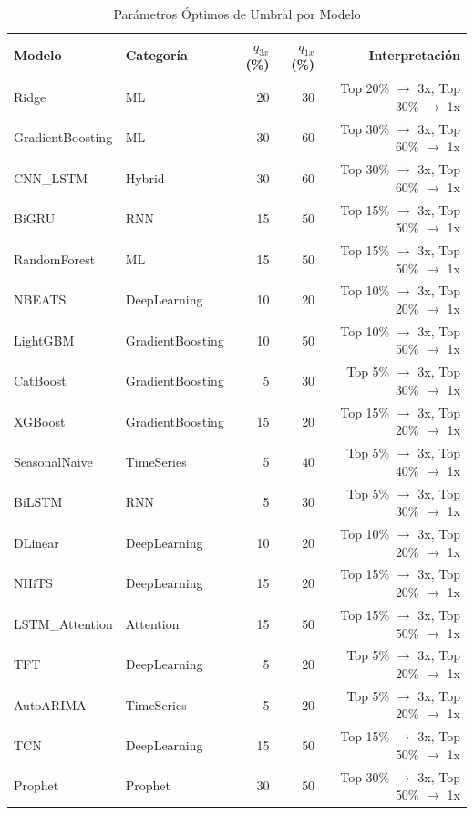\begin{table}[htbp]
\centering
\caption{Par\'ametros \'Optimos de Umbral por Modelo}
\label{tab:optimal_params}
\small
\begin{tabular}{@{}llrrr@{}}
\toprule
\textbf{Modelo} & \textbf{Categor\'ia} & \textbf{$q_{3x}$ (\%)} & \textbf{$q_{1x}$ (\%)} & \textbf{Interpretaci\'on} \\
\midrule
Ridge & ML & 20 & 30 & Top 20\% $\rightarrow$ 3x, Top 30\% $\rightarrow$ 1x \\
GradientBoosting & ML & 30 & 60 & Top 30\% $\rightarrow$ 3x, Top 60\% $\rightarrow$ 1x \\
CNN\_LSTM & Hybrid & 30 & 60 & Top 30\% $\rightarrow$ 3x, Top 60\% $\rightarrow$ 1x \\
BiGRU & RNN & 15 & 50 & Top 15\% $\rightarrow$ 3x, Top 50\% $\rightarrow$ 1x \\
RandomForest & ML & 15 & 50 & Top 15\% $\rightarrow$ 3x, Top 50\% $\rightarrow$ 1x \\
NBEATS & DeepLearning & 10 & 20 & Top 10\% $\rightarrow$ 3x, Top 20\% $\rightarrow$ 1x \\
LightGBM & GradientBoosting & 10 & 50 & Top 10\% $\rightarrow$ 3x, Top 50\% $\rightarrow$ 1x \\
CatBoost & GradientBoosting & 5 & 30 & Top 5\% $\rightarrow$ 3x, Top 30\% $\rightarrow$ 1x \\
XGBoost & GradientBoosting & 15 & 20 & Top 15\% $\rightarrow$ 3x, Top 20\% $\rightarrow$ 1x \\
SeasonalNaive & TimeSeries & 5 & 40 & Top 5\% $\rightarrow$ 3x, Top 40\% $\rightarrow$ 1x \\
BiLSTM & RNN & 5 & 30 & Top 5\% $\rightarrow$ 3x, Top 30\% $\rightarrow$ 1x \\
DLinear & DeepLearning & 10 & 20 & Top 10\% $\rightarrow$ 3x, Top 20\% $\rightarrow$ 1x \\
NHiTS & DeepLearning & 15 & 20 & Top 15\% $\rightarrow$ 3x, Top 20\% $\rightarrow$ 1x \\
LSTM\_Attention & Attention & 15 & 50 & Top 15\% $\rightarrow$ 3x, Top 50\% $\rightarrow$ 1x \\
TFT & DeepLearning & 5 & 20 & Top 5\% $\rightarrow$ 3x, Top 20\% $\rightarrow$ 1x \\
AutoARIMA & TimeSeries & 5 & 20 & Top 5\% $\rightarrow$ 3x, Top 20\% $\rightarrow$ 1x \\
TCN & DeepLearning & 15 & 50 & Top 15\% $\rightarrow$ 3x, Top 50\% $\rightarrow$ 1x \\
Prophet & Prophet & 30 & 50 & Top 30\% $\rightarrow$ 3x, Top 50\% $\rightarrow$ 1x \\

\end{tabular}
\end{table}
